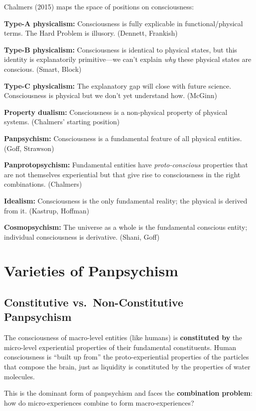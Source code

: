 \documentclass[11pt,a4paper]{report}
\begin{document}
\begin{definitionbox}
Chalmers (2015) maps the space of positions on consciousness:

\textbf{Type-A physicalism:} Consciousness is fully explicable in functional/physical terms. The Hard Problem is illusory. (Dennett, Frankish)

\textbf{Type-B physicalism:} Consciousness is identical to physical states, but this identity is explanatorily primitive---we can't explain \emph{why} these physical states are conscious. (Smart, Block)

\textbf{Type-C physicalism:} The explanatory gap will close with future science. Consciousness is physical but we don't yet understand how. (McGinn)

\textbf{Property dualism:} Consciousness is a non-physical property of physical systems. (Chalmers' starting position)

\textbf{Panpsychism:} Consciousness is a fundamental feature of all physical entities. (Goff, Strawson)

\textbf{Panprotopsychism:} Fundamental entities have \emph{proto-conscious} properties that are not themselves experiential but that give rise to consciousness in the right combinations. (Chalmers)

\textbf{Idealism:} Consciousness is the only fundamental reality; the physical is derived from it. (Kastrup, Hoffman)

\textbf{Cosmopsychism:} The universe as a whole is the fundamental conscious entity; individual consciousness is derivative. (Shani, Goff)
\end{definitionbox}


\chapter{Varieties of Panpsychism}

\section{Constitutive vs.\ Non-Constitutive Panpsychism}

\begin{varbox}
The consciousness of macro-level entities (like humans) is \textbf{constituted by} the micro-level experiential properties of their fundamental constituents. Human consciousness is ``built up from'' the proto-experiential properties of the particles that compose the brain, just as liquidity is constituted by the properties of water molecules.

This is the dominant form of panpsychism and faces the \textbf{combination problem}: how do micro-experiences combine to form macro-experiences?
\end{varbox}
\end{document}
